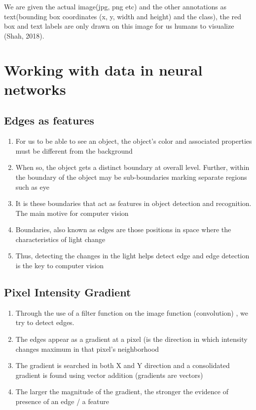 \documentclass[]{article}
\begin{document}
We are given the actual image(jpg, png etc) and the other annotations as text(bounding box coordinates (x, y, width and height) and the class), the red box and text labels are only drawn on this image for us humans to visualize (Shah, 2018).

\section{Working with data in neural networks}


\subsection{Edges as features}
\begin{enumerate}
\item For us to be able to see an object, the object’s color and associated properties 
must be different from the background
\item When so, the object gets a distinct boundary at overall level. Further, within the 
boundary of the object may be sub-boundaries marking separate regions such as eye
\item It is these boundaries that act as features in object detection and recognition. The main 
motive for computer vision
\item Boundaries, also known as edges are those positions in space where the characteristics 
of light change
\item Thus, detecting the changes in the light helps detect edge and edge detection is the key 
to computer vision
\end{enumerate}
\subsection{Pixel Intensity Gradient} 
\begin{enumerate}
\item Through the use of a filter function on the image function (convolution) , we try to 
detect edges. 
\item The edges appear as a gradient at a pixel (is the direction in which intensity 
changes maximum in that pixel’s neighborhood
\item The gradient is searched in both X and Y direction and a consolidated gradient is 
found using vector addition (gradients are vectors)
\item The larger the magnitude of the gradient, the stronger the evidence of presence 
of an edge / a feature
\end{enumerate}
\end{document}
